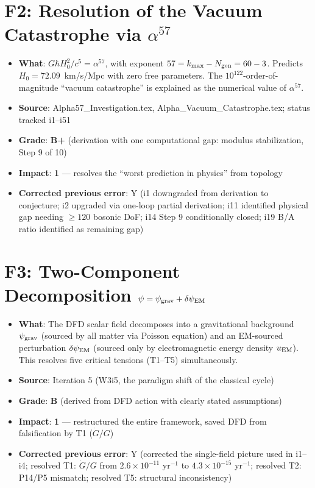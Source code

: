 \documentclass[11pt,a4paper]{article}
\newcommand{\grade}[1]{\textbf{#1}}
\newcommand{\impact}[1]{\textbf{#1}}
\begin{document}
\section{F2: Resolution of the Vacuum Catastrophe via $\alpha^{57}$}
\begin{itemize}[nosep]
\item \textbf{What}: $G\hbar H_0^2/c^5 = \alpha^{57}$, with exponent $57 = k_{\max} - N_{\rm gen} = 60 - 3$. Predicts $H_0 = 72.09$~km/s/Mpc with zero free parameters. The $10^{122}$-order-of-magnitude ``vacuum catastrophe'' is explained as the numerical value of $\alpha^{57}$.
\item \textbf{Source}: Alpha57\_Investigation.tex, Alpha\_Vacuum\_Catastrophe.tex; status tracked i1--i51
\item \textbf{Grade}: \grade{B+} (derivation with one computational gap: modulus stabilization, Step 9 of 10)
\item \textbf{Impact}: \impact{1} --- resolves the ``worst prediction in physics'' from topology
\item \textbf{Corrected previous error}: Y (i1 downgraded from derivation to conjecture; i2 upgraded via one-loop partial derivation; i11 identified physical gap needing $\geq 120$ bosonic DoF; i14 Step 9 conditionally closed; i19 B/A ratio identified as remaining gap)
\end{itemize}

\section{F3: Two-Component Decomposition $\psi = \psi_{\rm grav} + \delta\psi_{\rm EM}$}
\begin{itemize}[nosep]
\item \textbf{What}: The DFD scalar field decomposes into a gravitational background $\psi_{\rm grav}$ (sourced by all matter via Poisson equation) and an EM-sourced perturbation $\delta\psi_{\rm EM}$ (sourced only by electromagnetic energy density $u_{\rm EM}$). This resolves five critical tensions (T1--T5) simultaneously.
\item \textbf{Source}: Iteration 5 (W3i5, the paradigm shift of the classical cycle)
\item \textbf{Grade}: \grade{B} (derived from DFD action with clearly stated assumptions)
\item \textbf{Impact}: \impact{1} --- restructured the entire framework, saved DFD from falsification by T1 ($\dot{G}/G$)
\item \textbf{Corrected previous error}: Y (corrected the single-field picture used in i1--i4; resolved T1: $\dot{G}/G$ from $2.6 \times 10^{-11}$ yr$^{-1}$ to $4.3 \times 10^{-15}$ yr$^{-1}$; resolved T2: P14/P5 mismatch; resolved T5: structural inconsistency)
\end{itemize}
\end{document}
